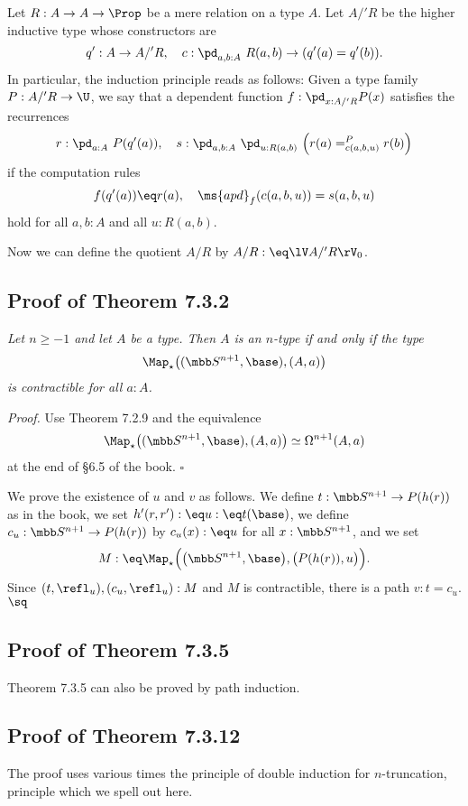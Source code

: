 \documentclass[12pt]{article}
\begin{document}
Let $R:A\to A\to\Prop$ be a mere relation on a type $A$. Let $A/'R$ be the higher inductive type whose constructors are 
$$
q':A\to A/'R,\quad c:\pd_{a,b:A}\ R(a,b)\to(q'(a)=q'(b)).
$$ 
In particular, the induction principle reads as follows: Given a type family $P:A/'R\to\U$, we say that a dependent function $f:\pd_{x:A/'R}P(x)$ satisfies the recurrences 
$$
r:\pd_{a:A}\ P(q'(a)),\quad s:\pd_{a,b:A}\ \pd_{u:R(a,b)}\ \Big(r(a)=^P_{c(a,b,u)}r(b)\Big)
$$ 
if the computation rules 
$$
f(q'(a))\eq r(a),\quad\ms{apd}_f(c(a,b,u))=s(a,b,u)
$$ 
hold for all $a,b:A$ and all $u:R(a,b)$. 

Now we can define the quotient $A/R$ by $A/R:\eq\lV A/'R\rV_0$. 


\subsection{Proof of Theorem 7.3.2}

 \emph{Let $n\ge-1$ and let $A$ be a type. Then $A$ is an $n$-type if and only if the type 
$$
\Map_\star\big((\mbb S^{n+1},\base),(A,a)\big)
$$ 
is contractible for all $a:A$.}

\nn\emph{Proof.} Use Theorem 7.2.9 and the equivalence 
$$
\Map_\star\big((\mbb S^{n+1},\base),(A,a)\big)\simeq\Omega^{n+1}(A,a)
$$ 
at the end of \S6.5 of the book. $\square$

We prove the existence of $u$ and $v$ as follows. We define $t:\mbb S^{n+1}\to P(h(r))$ as in the book, we set $h'(r,r'):\eq u:\eq t(\base)$, we define $c_u:\mbb S^{n+1}\to P(h(r))$ by $c_u(x):\eq u$ for all $x:\mbb S^{n+1}$, and we set
$$
M:\eq\Map_\star\Big(\big(\mbb S^{n+1},\base\big),\big(P(h(r)),u\big)\Big).
$$ 
Since $(t,\refl_u),(c_u,\refl_u):M$ and $M$ is contractible, there is a path $v:t=c_u$. $\sq$


\subsection{Proof of Theorem 7.3.5}

Theorem 7.3.5 can also be proved by path induction.


\subsection{Proof of Theorem 7.3.12}

The proof uses various times the principle of double induction for $n$-truncation, principle which we spell out here.
\end{document}

